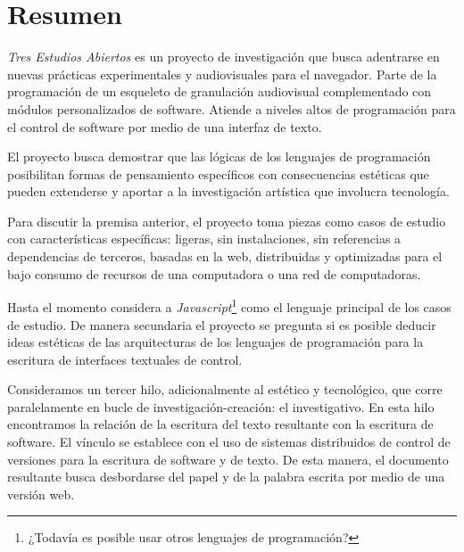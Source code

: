 
\section*{Resumen}

\textit{Tres Estudios Abiertos} es un proyecto de investigación que busca adentrarse en nuevas prácticas experimentales y audiovisuales para el navegador. Parte de la programación de un esqueleto de granulación audiovisual complementado con módulos personalizados de software. Atiende a niveles altos de programación para el control de software por medio de una interfaz de texto. 

El proyecto busca demostrar que las lógicas de los lenguajes de programación posibilitan formas de pensamiento específicos con consecuencias estéticas que pueden extenderse y aportar a la investigación artística que involucra tecnología. 

Para discutir la premisa anterior, el proyecto toma piezas como casos de estudio con características específicas: ligeras, sin instalaciones, sin referencias a dependencias de terceros, basadas en la web, distribuidas y optimizadas para el bajo consumo de recursos de una computadora o una red de computadoras. 

Hasta el momento considera a \textit{Javascript}\footnote{¿Todavía es posible usar otros lenguajes de programación?} como el lenguaje principal de los casos de estudio. De manera secundaria el proyecto se pregunta si es posible deducir ideas estéticas de las arquitecturas de los lenguajes de programación para la escritura de interfaces textuales de control. 

Consideramos un tercer hilo, adicionalmente al estético y tecnológico, que corre paralelamente en bucle de investigación-creación: el investigativo. En esta hilo encontramos la relación de la escritura del texto resultante con la escritura de software. El vínculo se establece con el uso de sistemas distribuidos de control de versiones para la escritura de software y de texto. De esta manera, el documento resultante busca desbordarse del papel y de la palabra escrita por medio de una versión web. 

